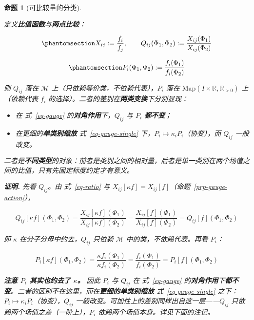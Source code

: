 \documentclass[
  chinese,
  a4paper,
  UTF8,
  12pt,
  oneside,
  openany]{ctexbook}
\providecommand{\tightlist}{%
  \setlength{\itemsep}{0pt}\setlength{\parskip}{0pt}}
\theoremstyle{plain}
\theoremstyle{plain}
\theoremstyle{plain}
\newtheorem{proposition}{命题}[chapter]
\theoremstyle{definition}
\theoremstyle{plain}
\theoremstyle{plain}
\theoremstyle{remark}
\begin{document}
\begin{proposition}[可比较量的分类]\protect\hypertarget{prp-comparables}{}\label{prp-comparables}

定义\textbf{比值函数}与\textbf{两点比较}：

\begin{equation}\protect\phantomsection\label{eq-ratio}{
X_{ij} := \frac{f_i}{f_j},
\qquad
Q_{ij}(\Phi_1,\Phi_2) := \frac{X_{ij}(\Phi_1)}{X_{ij}(\Phi_2)}
}\end{equation}

\begin{equation}\protect\phantomsection\label{eq-two-point}{
P_i(\Phi_1,\Phi_2) := \frac{f_i(\Phi_1)}{f_i(\Phi_2)}
}\end{equation}

则 \(Q_{ij}\) 落在 \(\mathscr{M}\)
上（只依赖等价类，不依赖代表），\(P_i\) 落在
\(\mathrm{Map}(I\times\mathbb{R},\mathbb{R}_{>0})\) 上（依赖代表 \(f_i\)
的选择）。二者的差别在\textbf{两类变换}下分别显现：

\begin{itemize}
\tightlist
\item
  在 式~\ref{eq-gauge} 的\textbf{对角作用}下，\(Q_{ij}\) 与 \(P_i\)
  \textbf{都不变}；
\item
  在更细的\textbf{单类别缩放} 式~\ref{eq-gauge-single}
  下，\(P_i\mapsto\kappa_i P_i\)（协变），而 \(Q_{ij}\) 一般改变。
\end{itemize}

二者是\textbf{不同类型}的对象：前者是类别之间的相对量，后者是单一类别在两个场值之间的比值，只有先固定标度约定才有意义。

\textbf{证明.} 先看 \(Q_{ij}\)。由 式~\ref{eq-ratio} 与
\(X_{ij}[\kappa f]=X_{ij}[f]\)（命题~\ref{prp-gauge-action}），

\[
Q_{ij}[\kappa f](\Phi_1,\Phi_2)
=\frac{X_{ij}[\kappa f](\Phi_1)}{X_{ij}[\kappa f](\Phi_2)}
=\frac{X_{ij}[f](\Phi_1)}{X_{ij}[f](\Phi_2)}
=Q_{ij}[f](\Phi_1,\Phi_2)
\]

即 \(\kappa\) 在分子分母中约去，\(Q_{ij}\) 只依赖 \(\mathscr{M}\)
中的类，不依赖代表。再看 \(P_i\)：

\[
P_i[\kappa f](\Phi_1,\Phi_2)
=\frac{\kappa f_i(\Phi_1)}{\kappa f_i(\Phi_2)}
=\frac{f_i(\Phi_1)}{f_i(\Phi_2)}
=P_i[f](\Phi_1,\Phi_2)
\]

\textbf{注意 \(P_i\) 其实也约去了 \(\kappa\)。} 因此 \(P_i\) 与
\(Q_{ij}\) 在 式~\ref{eq-gauge}
的\textbf{对角作用}下\textbf{都不变}。二者的区别不在这里，而在\textbf{更细的单类别缩放}
式~\ref{eq-gauge-single}
之下：\(P_i\mapsto\kappa_i P_i\)（协变），\(Q_{ij}\)
一般改变。可加性上的差别同样出自这一层------\(Q_{ij}\)
只依赖两个场值之差（一阶上），\(P_i\) 依赖两个场值本身。详见下面的注记。

\end{proposition}
\end{document}
